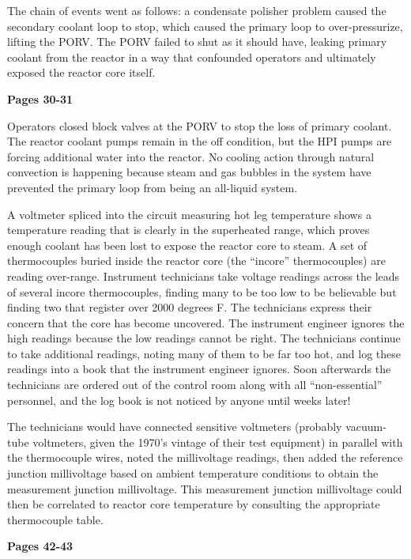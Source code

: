 The chain of events went as follows: a condensate polisher problem caused the secondary coolant loop to stop, which caused the primary loop to over-pressurize, lifting the PORV.  The PORV failed to shut as it should have, leaking primary coolant from the reactor in a way that confounded operators and ultimately exposed the reactor core itself.

\vskip 10pt

\noindent
{\bf Pages 30-31}

Operators closed block valves at the PORV to stop the loss of primary coolant.  The reactor coolant pumps remain in the off condition, but the HPI pumps are forcing additional water into the reactor.  No cooling action through natural convection is happening because steam and gas bubbles in the system have prevented the primary loop from being an all-liquid system.

A voltmeter spliced into the circuit measuring hot leg temperature shows a temperature reading that is clearly in the superheated range, which proves enough coolant has been lost to expose the reactor core to steam.  A set of thermocouples buried inside the reactor core (the ``incore'' thermocouples) are reading over-range.  Instrument technicians take voltage readings across the leads of several incore thermocouples, finding many to be too low to be believable but finding two that register over 2000 degrees F.  The technicians express their concern that the core has become uncovered.  The instrument engineer ignores the high readings because the low readings cannot be right.  The technicians continue to take additional readings, noting many of them to be far too hot, and log these readings into a book that the instrument engineer ignores.  Soon afterwards the technicians are ordered out of the control room along with all ``non-essential'' personnel, and the log book is not noticed by anyone until weeks later!

The technicians would have connected sensitive voltmeters (probably vacuum-tube voltmeters, given the 1970's vintage of their test equipment) in parallel with the thermocouple wires, noted the millivoltage readings, then added the reference junction millivoltage based on ambient temperature conditions to obtain the measurement junction millivoltage.  This measurement junction millivoltage could then be correlated to reactor core temperature by consulting the appropriate thermocouple table.

\vskip 10pt

\noindent
{\bf Pages 42-43}

